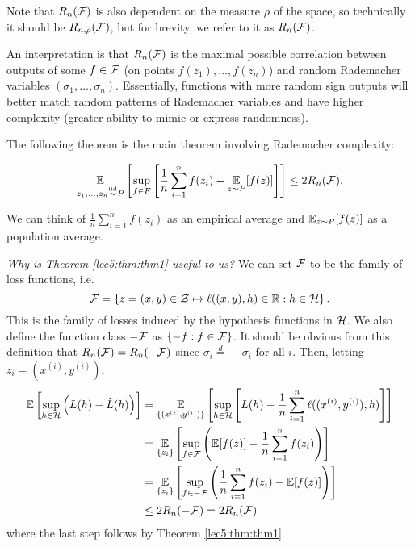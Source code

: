 \begin{remark}
Note that $R_n(\mathcal F)$ is also dependent on the measure $\rho$ of the space, so technically it should be $R_{n,\rho}(\mathcal F)$, but for brevity, we refer to it as $R_n(\mathcal F)$.
\end{remark}

An interpretation is that $R_n(\mathcal F)$ is the maximal possible correlation between outputs of some $f \in \mathcal F$ (on points $f(z_1), \dots, f(z_n)$) and random Rademacher variables $ (\sigma_1, \dots, \sigma_n).$ Essentially, functions with more random sign outputs will better match random patterns of Rademacher variables and have higher complexity (greater ability to mimic or express randomness).

The following theorem is the main theorem involving Rademacher complexity:

\begin{theorem} \label{lec5:thm:thm1}
    \begin{align}
       \operatorname*{\mathbb{E}}_{z_1, \dots, z_n \overset{\textup{iid}}{\sim} P} \left[ \sup_{f\in F} \left[ \frac{1}{n} \sum^n_{i=1} f(z_i) -  \operatorname*{\mathbb{E}}_{z\sim P} [f(z)] \right]\right] \leq 2 R_n(\mathcal F). \label{lec5:eqn:thm1}
    \end{align}
\end{theorem}

\begin{remark}
We can think of $\frac{1}{n} \sum^n_{i=1} f(z_i)$ as an empirical average and $\operatorname*{\mathbb{E}}_{z\sim P} [f(z)]$ as a population average.
\end{remark}
\noindent\textit{Why is Theorem \ref{lec5:thm:thm1} useful to us?} We can set $\mathcal F$ to be the family of loss functions, i.e.
\begin{equation}
\mathcal F = \left\{ z = (x,y) \in \mathcal Z \mapsto \ell((x,y),h) \in \mathbb R : h \in \mathcal H \right\}.
\end{equation} 
This is the family of losses induced by the hypothesis functions in $\mathcal H$. We also define the function class $-\mathcal F$ as $\{-f : f \in \mathcal F\}$. It should be obvious from this definition that $R_n(\mathcal F) = R_n(-\mathcal F)$ since $\sigma_i \stackrel{d}{=} -\sigma_i$ for all $i$. Then, letting $z_i = (x^{(i)}, y^{(i)})$,
\begin{align}
    \operatorname*{\mathbb{E}}\left[ \sup_{h \in \mathcal H}\left( L(h) - \hat L (h) \right) \right] &= \operatorname*{\mathbb{E}}_{\{(x^{(i)}, y^{(i)})\}} \left[ \sup_{h \in \mathcal H} \left[L(h) - \frac{1}{n} \sum^n_{i=1} \ell((x^{(i)}, y^{(i)}), h) \right] \right] \\
    &= \operatorname*{\mathbb{E}}_{\{z_i\}} \left[\sup_{f \in \mathcal F} \left(\operatorname*{\mathbb{E}}[f(z)] - \frac{1}{n} \sum^n_{i=1} f(z_i) \right)\right] \\
    &= \operatorname*{\mathbb{E}}_{\{z_i\}} \left[\sup_{f \in -\mathcal F} \left(\frac{1}{n} \sum^n_{i=1} f(z_i) - \operatorname*{\mathbb{E}}[f(z)] \right)\right] \\
    &\leq 2 R_n(-\mathcal F) = 2R_n(\mathcal F)
\end{align}
where the last step follows by Theorem \ref{lec5:thm:thm1}. 

